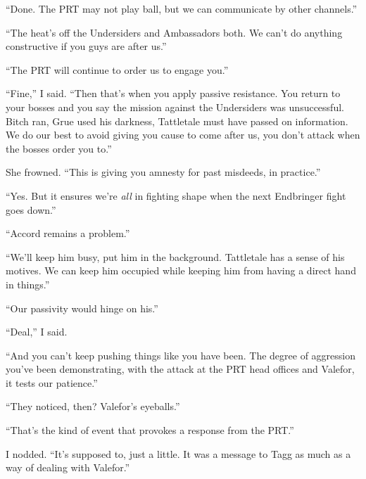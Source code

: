 ``Done.  The PRT may not play ball, but we can communicate by other channels.''



``The heat's off the Undersiders and Ambassadors both.  We can't do anything constructive if you guys are after us.''



``The PRT will continue to order us to engage you.''



``Fine,'' I said.  ``Then that's when you apply passive resistance.  You return to your bosses and you say the mission against the Undersiders was unsuccessful.  Bitch ran, Grue used his darkness, Tattletale must have passed on information.  We do our best to avoid giving you cause to come after us, you don't attack when the bosses order you to.''



She frowned.  ``This is giving you amnesty for past misdeeds, in practice.''



``Yes.  But it ensures we're \emph{all} in fighting shape when the next Endbringer fight goes down.''



``Accord remains a problem.''



``We'll keep him busy, put him in the background.  Tattletale has a sense of his motives.  We can keep him occupied while keeping him from having a direct hand in things.''



``Our passivity would hinge on his.''



``Deal,'' I said.



``And you can't keep pushing things like you have been.  The degree of aggression you've been demonstrating, with the attack at the PRT head offices and Valefor, it tests our patience.''



``They noticed, then?  Valefor's eyeballs.''



``That's the kind of event that provokes a response from the PRT.''



I nodded.  ``It's supposed to, just a little.  It was a message to Tagg as much as a way of dealing with Valefor.''



